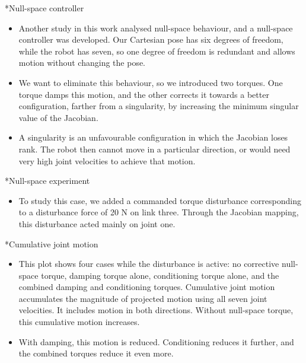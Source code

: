 \documentclass[12pt,a4paper]{article}
\makeatletter
\renewcommand\section{\@startsection{section}{1}{0pt}{14pt}{6pt}{\normalfont\Large\bfseries\color{navy}}}
\makeatother
\begin{document}
\section*{Null-space controller}
\begin{itemize}
\item Another study in this work analysed null-space behaviour, and a null-space controller was developed. Our Cartesian pose has six degrees of freedom, while the robot has seven, so one degree of freedom is redundant and allows motion without changing the pose.
\item We want to eliminate this behaviour, so we introduced two torques. One torque damps this motion, and the other corrects it towards a better configuration, farther from a singularity, by increasing the minimum singular value of the Jacobian.
\item A singularity is an unfavourable configuration in which the Jacobian loses rank. The robot then cannot move in a particular direction, or would need very high joint velocities to achieve that motion.
\end{itemize}

\section*{Null-space experiment}
\begin{itemize}
\item To study this case, we added a commanded torque disturbance corresponding to a disturbance force of 20 N on link three. Through the Jacobian mapping, this disturbance acted mainly on joint one.
\end{itemize}

\section*{Cumulative joint motion}
\begin{itemize}
\item This plot shows four cases while the disturbance is active: no corrective null-space torque, damping torque alone, conditioning torque alone, and the combined damping and conditioning torques. Cumulative joint motion accumulates the magnitude of projected motion using all seven joint velocities. It includes motion in both directions. Without null-space torque, this cumulative motion increases.
\item With damping, this motion is reduced. Conditioning reduces it further, and the combined torques reduce it even more.
\end{itemize}
\end{document}
